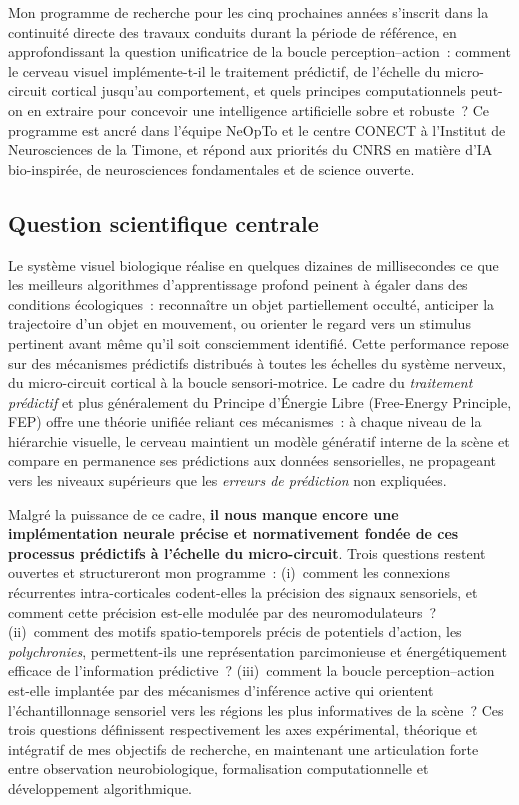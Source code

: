 \documentclass[10pt,french,a4paper]{article}%
\begin{document}
Mon programme de recherche pour les cinq prochaines années s'inscrit dans la continuité directe des travaux conduits durant la période de référence, en approfondissant la question unificatrice de la boucle perception--action~: comment le cerveau visuel implémente-t-il le traitement prédictif, de l'échelle du micro-circuit cortical jusqu'au comportement, et quels principes computationnels peut-on en extraire pour concevoir une intelligence artificielle sobre et robuste~? Ce programme est ancré dans l'équipe NeOpTo et le centre CONECT à l'Institut de Neurosciences de la Timone, et répond aux priorités du CNRS en matière d'IA bio-inspirée, de neurosciences fondamentales et de science ouverte.

\subsection{Question scientifique centrale}

Le système visuel biologique réalise en quelques dizaines de millisecondes ce que les meilleurs algorithmes d'apprentissage profond peinent à égaler dans des conditions écologiques~: reconnaître un objet partiellement occulté, anticiper la trajectoire d'un objet en mouvement, ou orienter le regard vers un stimulus pertinent avant même qu'il soit consciemment identifié. Cette performance repose sur des mécanismes prédictifs distribués à toutes les échelles du système nerveux, du micro-circuit cortical à la boucle sensori-motrice. Le cadre du \emph{traitement prédictif} et plus généralement du Principe d'Énergie Libre (Free-Energy Principle, FEP) offre une théorie unifiée reliant ces mécanismes~: à chaque niveau de la hiérarchie visuelle, le cerveau maintient un modèle génératif interne de la scène et compare en permanence ses prédictions aux données sensorielles, ne propageant vers les niveaux supérieurs que les \emph{erreurs de prédiction} non expliquées.

Malgré la puissance de ce cadre, \textbf{il nous manque encore une implémentation neurale précise et normativement fondée de ces processus prédictifs à l'échelle du micro-circuit}. Trois questions restent ouvertes et structureront mon programme~: (i)~comment les connexions récurrentes intra-corticales codent-elles la précision des signaux sensoriels, et comment cette précision est-elle modulée par des neuromodulateurs~? (ii)~comment des motifs spatio-temporels précis de potentiels d'action, les \emph{polychronies}, permettent-ils une représentation parcimonieuse et énergétiquement efficace de l'information prédictive~? (iii)~comment la boucle perception--action est-elle implantée par des mécanismes d'inférence active qui orientent l'échantillonnage sensoriel vers les régions les plus informatives de la scène~? Ces trois questions définissent respectivement les axes expérimental, théorique et intégratif de mes objectifs de recherche, en maintenant une articulation forte entre observation neurobiologique, formalisation computationnelle et développement algorithmique.
\end{document}

